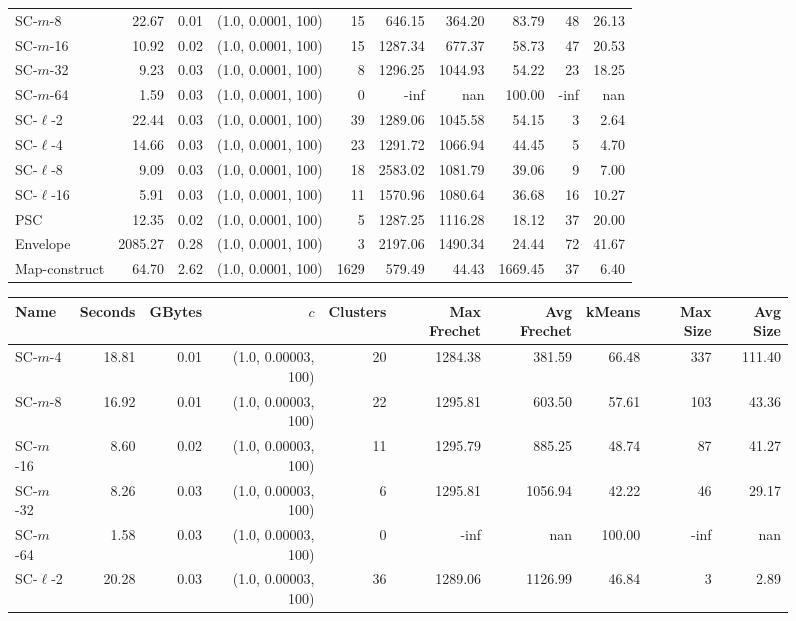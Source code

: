 \documentclass[11pt]{article}
\begin{document}
\begin{figure}
\begin{center}
\begin{minipage}{\textwidth}
{\begin{tabular}{@{}lrrrrrrrrr@{}}
SC-$m$-8 & 22.67 & 0.01 & (1.0, 0.0001, 100) & 15 & 646.15 & 364.20 & 83.79 & 48 & 26.13\\
SC-$m$-16 & 10.92 & 0.02 & (1.0, 0.0001, 100) & 15 & 1287.34 & 677.37 & 58.73 & 47 & 20.53\\
SC-$m$-32 & 9.23 & 0.03 & (1.0, 0.0001, 100) & 8 & 1296.25 & 1044.93 & 54.22 & 23 & 18.25\\
SC-$m$-64 & 1.59 & 0.03 & (1.0, 0.0001, 100) & 0 & -inf & nan & 100.00 & -inf & nan\\
SC-$\ell$-2 & 22.44 & 0.03 & (1.0, 0.0001, 100) & 39 & 1289.06 & 1045.58 & 54.15 & 3 & 2.64\\
SC-$\ell$-4 & 14.66 & 0.03 & (1.0, 0.0001, 100) & 23 & 1291.72 & 1066.94 & 44.45 & 5 & 4.70\\
SC-$\ell$-8 & 9.09 & 0.03 & (1.0, 0.0001, 100) & 18 & 2583.02 & 1081.79 & 39.06 & 9 & 7.00\\
SC-$\ell$-16 & 5.91 & 0.03 & (1.0, 0.0001, 100) & 11 & 1570.96 & 1080.64 & 36.68 & 16 & 10.27\\
PSC & 12.35 & 0.02 & (1.0, 0.0001, 100) & 5 & 1287.25 & 1116.28 & 18.12 & 37 & 20.00\\
Envelope & 2085.27 & 0.28 & (1.0, 0.0001, 100) & 3 & 2197.06 & 1490.34 & 24.44 & 72 & 41.67\\
Map-construct & 64.70 & 2.62 & (1.0, 0.0001, 100) & 1629 & 579.49 & 44.43 & 1669.45 & 37 & 6.40\\
        \bottomrule
    \end{tabular}
    }
    {
    \begin{tabular}{@{}lrrrrrrrrr@{}}
        \toprule
        Name & Seconds & GBytes & $c$ & Clusters & Max Frechet & Avg Frechet & kMeans & Max Size & Avg Size\\
        \midrule
        SC-$m$-4 & 18.81 & 0.01 & (1.0, 0.00003, 100) & 20 & 1284.38 & 381.59 & 66.48 & 337 & 111.40\\
SC-$m$-8 & 16.92 & 0.01 & (1.0, 0.00003, 100) & 22 & 1295.81 & 603.50 & 57.61 & 103 & 43.36\\
SC-$m$-16 & 8.60 & 0.02 & (1.0, 0.00003, 100) & 11 & 1295.79 & 885.25 & 48.74 & 87 & 41.27\\
SC-$m$-32 & 8.26 & 0.03 & (1.0, 0.00003, 100) & 6 & 1295.81 & 1056.94 & 42.22 & 46 & 29.17\\
SC-$m$-64 & 1.58 & 0.03 & (1.0, 0.00003, 100) & 0 & -inf & nan & 100.00 & -inf & nan\\
SC-$\ell$-2 & 20.28 & 0.03 & (1.0, 0.00003, 100) & 36 & 1289.06 & 1126.99 & 46.84 & 3 & 2.89\\

\end{tabular}}
\end{minipage}
\end{center}
\end{figure}
\end{document}
